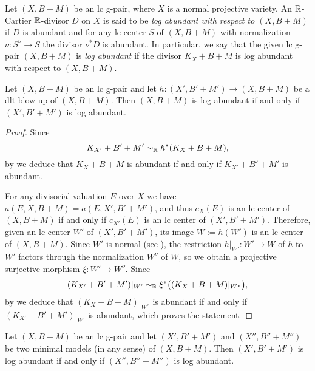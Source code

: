 	\begin{dfn}
		Let $ (X,B+M) $ be an lc g-pair, where $ X $ is a normal projective variety. An $ \mathbb{R} $-Cartier $ \mathbb{R} $-divisor $ D $ on $ X $ is said to be \emph{log abundant with respect to $ (X,B+M) $} if $ D $ is abundant and for any lc center $ S $ of $ (X,B+M) $ with normalization $ \nu \colon S^\nu \to S $ the divisor $ \nu^* D $ is abundant. In particular, we say that the given lc g-pair $ (X,B+M) $ is \emph{log abundant} if the divisor $ K_X+B+M $ is log abundant with respect to $ (X,B+M) $.
	\end{dfn}
	
	\begin{lem}\label{lem:dlt_blow-up_log_abundant}
		Let $(X,B+M)$ be an lc g-pair and let $h \colon (X',B'+M') \to (X,B+M) $ be a dlt blow-up of $(X,B+M)$. Then $(X,B+M)$ is log abundant if and only if $(X',B'+M')$ is log abundant.
	\end{lem}
	
	\begin{proof}
		Since
		$$ K_{X'} + B' + M' \sim_{\mathbb{R}} h^* (K_X + B + M) , $$
		by \cite[Remark 2.15(2)]{Hash20d} we deduce that $K_X+B+M$ is abundant if and only if $K_{X'}+B'+M'$ is abundant.
		
		For any divisorial valuation $E$ over $X$ we have $a(E,X,B+M) = a(E,X',B'+M')$, and thus $c_X(E)$ is an lc center of $(X,B+M)$ if and only if $c_{X'}(E)$ is an lc center of $(X',B'+M')$. Therefore, given an lc center $W'$ of $(X',B'+M')$, its image $W := h(W')$ is an lc center of $(X,B+M)$. Since $W'$ is normal (see \cite[Subsection 2.3]{HanLi22}), the restriction $ h|_{W'} \colon W' \to W $ of $h$ to $W'$ factors through the normalization $W^\nu$ of $W$, so we obtain a projective surjective morphism $ \xi \colon W' \to W^\nu $. Since 
		\[ (K_{X'}+B'+M')|_{W'} \sim_{\mathbb{R}} \xi^* \big( (K_X+B+M)|_{W^\nu} \big) , \]
		by \cite[Remark 2.15(2)]{Hash20d} we deduce that $(K_X+B+M)|_{W^\nu}$ is abundant if and only if $(K_{X'}+B'+M')|_{W'}$ is abundant, which proves the statement.
	\end{proof}
	
	\begin{lem}\label{lem:log_abundant_MMs}
		Let $(X,B+M)$ be an lc g-pair and let $(X',B'+M')$ and $(X'',B''+M'')$ be two minimal models (in any sense) of $(X,B+M)$. Then $(X',B'+M')$ is log abundant if and only if $(X'',B''+M'')$ is log abundant.
	\end{lem}
	
